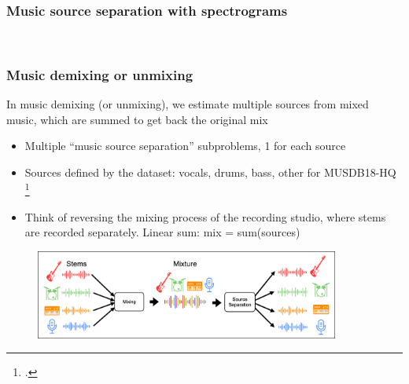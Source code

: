 \documentclass[usenames,dvipsnames]{beamer}
\begin{document}
\begin{frame}
	\frametitle{Music source separation with spectrograms}
	\begin{figure}
		\centering
		\\
	\end{figure}
\end{frame}

\begin{frame}
	\frametitle{Music demixing or unmixing}
	In music demixing (or unmixing), we estimate multiple sources from mixed music, which are summed to get back the original mix
	\begin{itemize}
		\item
			Multiple ``music source separation'' subproblems, 1 for each source
		\item
			Sources defined by the dataset: vocals, drums, bass, other for MUSDB18-HQ \footcite{musdb18hq}
		\item
			Think of reversing the mixing process of the recording studio, where stems are recorded separately. Linear sum: mix = sum(sources)
	\end{itemize}
	\begin{figure}[ht]
		\centering
		\vspace{-0.5em}
		\includegraphics[width=10cm]{./images-mss/mixdemix.png}
	\end{figure}
\end{frame}
\end{document}
